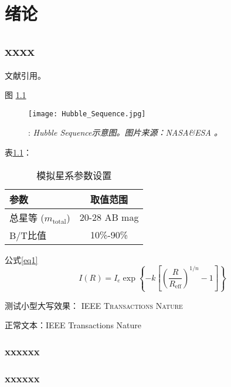 \chapter{绪论}
\section{xxxx}
文献引用\cite{Kormendy2004,Sandage2005,mo2010}。

图 \ref{fig:hubble_sequence}
\begin{figure}[htbp]
\centering
\texttt{[image: Hubble\_Sequence.jpg]}
\caption{: \emph{Hubble Sequence示意图。图片来源：NASA\&ESA 。}}
\label{fig:hubble_sequence}
\end{figure}

表\ref{tab:simulation_parameters}：
\begin{table}[htbp]
\centering
\caption{模拟星系参数设置}
\label{tab:simulation_parameters}
\begin{tabular}{lc}
\hline
\hline
\textbf{参数} & \textbf{取值范围} \\
\hline
总星等 ($m_{\text{total}}$) & 20-28 AB mag \\
B/T比值 & 10\%-90\% \\
\hline
\hline
\end{tabular}
\end{table}

公式\ref{eq1}
\begin{equation}
I(R) = I_e \exp\left\{-k\left[\left(\frac{R}{R_{\text{eff}}}\right)^{1/n} - 1\right]\right\}
\label{eq1}
\end{equation}

测试小型大写效果：
\textsc{IEEE Transactions}
\textsc{Nature}

正常文本：IEEE Transactions Nature

\subsection{xxxxxx}

\subsection{xxxxxx}

